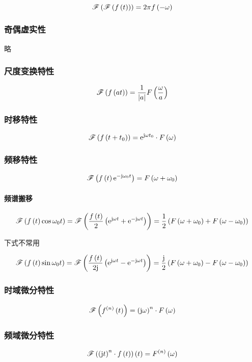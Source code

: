 \documentclass{article}
\begin{document}
\[\fourier{\fourier\ft}=2\pi f\pare{-\omega}\]

\subsubsection{奇偶虚实性}

略

\subsubsection{尺度变换特性}

\[\fourier{f\pare{at}}=\frac1{\abs a}F\pare{\frac\omega a}\]

\subsubsection{时移特性}

\[\fourier{f\pare{t+t_0}}=\e^{\j\omega t_0}\cdot \fw\]

\subsubsection{频移特性}

\[\fourier{\ft\e^{-\j\omega_0t}}=F\pare{\omega+\omega_0}\]

\paragraph{频谱搬移}

\[\fourier{\ft\cos\omega_0t}
    =\fourier{\frac\ft2\pare{\e^{\j\omega t}+\e^{-\j\omega t}}}
    =\frac12\pare{F\pare{\omega+\omega_0}+F\pare{\omega-\omega_0}}\]

下式不常用

\[\fourier{\ft\sin\omega_0t}
    =\fourier{\frac\ft{2\j}\pare{\e^{\j\omega t}-\e^{-\j\omega t}}}
    =\frac\j2\pare{F\pare{\omega+\omega_0}-F\pare{\omega-\omega_0}}\]

\subsubsection{时域微分特性}

\[\fourier{f^{\pare{n}}\pare{t}}=\pare{\j\omega}^n\cdot \fw\]

\subsubsection{频域微分特性}

\[\fourier{\pare{\j t}^n\cdot\ft}\pare{t}=F^{\pare{n}}\pare{\omega}\]
\end{document}
